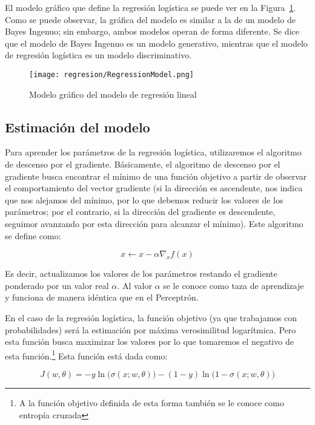 El modelo gráfico que define la regresión logística se puede ver en la Figura~\ref{Fig:LinearReg}. Como se puede observar, la gráfica del modelo es similar a la de un modelo de Bayes Ingenuo; sin embargo, ambos modelos operan de forma diferente. Se dice que el modelo de Bayes Ingenuo es un modelo generativo, mientras que el modelo de regresión logística es un modelo discriminativo.

\begin{figure}
 \centering
 \texttt{[image: regresion/RegressionModel.png]}
 \caption{Modelo gráfico del modelo de regresión lineal}\label{Fig:LinearReg}
\end{figure}    




\subsection{Estimación del modelo}

Para aprender los parámetros de la regresión logística, utilizaremos el algoritmo de descenso por el gradiente. Básicamente, el algoritmo de descenso por el gradiente busca encontrar el mínimo de una función objetivo a partir de observar el comportamiento del vector gradiente {\color{gray}(si la dirección es ascendente, nos indica que nos alejamos del mínimo, por lo que debemos reducir los valores de los parámetros; por el contrario, si la dirección del gradiente es descendente, seguimor avanzando por esta dirección para alcanzar el mínimo)}. Este algoritmo se define como:

$$ x \leftarrow x - \alpha \nabla_x f(x) $$

Es decir, actualizamos los valores de los parámetros restando el gradiente ponderado por un valor real $\alpha$. Al valor $\alpha$ se le conoce como taza de aprendizaje y funciona de manera idéntica que en el Perceptrón.

En el caso de la regresión logística, la función objetivo (ya que trabajamos con probabilidades) será la estimación por máxima verosimilitud logarítmica. Pero esta función busca maximizar los valores por lo que tomaremos el negativo de esta función.\footnote{A la función objetivo definida de esta forma también se le conoce como entropía cruzada} Esta función está dada como:

\begin{equation*}
    J(w, \theta) = - y \ln\big( \sigma(x; w, \theta)\big) - (1- y) \ln\big( 1-\sigma(x; w, \theta) \big)
\end{equation*}

